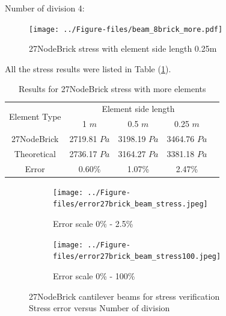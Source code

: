 \documentclass[fleqn,11pt]{article}
\begin{document}
Number of division 4:

\begin{figure}[H]
  \centering
  \texttt{[image: ../Figure-files/beam\_8brick\_more.pdf]}
  \caption{27NodeBrick stress with element side length 0.25m}
  \label{fig 27NodeBrick stress with element side length 0.25m}
\end{figure}


All the stress results were listed in Table (\ref{table Results for 27NodeBrick stress with more elements}). 


\begin{table}[H]
  \centering
  \caption{Results for 27NodeBrick stress with more elements}
  \label{table Results for 27NodeBrick stress with more elements}
  \begin{tabular}{|c|c|c|c|c|}
    \hline 
    \multirow{2}{*}{Element Type} 
       & \multicolumn{3}{|c|}{Element side length} \\ \cline{2-4}
       & 1 $m$ & 0.5 $m$ & 0.25 $m$ \\                              \hline
27NodeBrick & 2719.81 $Pa$ & 3198.19 $Pa$ & 3464.76 $Pa$ \\ \hline
Theoretical & 2736.17 $Pa$ & 3164.27 $Pa$ & 3381.18 $Pa$ \\ \hline
Error       & 0.60\%  & 1.07\%  & 2.47\%        \\ \hline
  \end{tabular}
\end{table}



\begin{figure}[H]
  \begin{subfigure}{0.5\textwidth}
    \centering
    \texttt{[image: ../Figure-files/error27brick\_beam\_stress.jpeg]}
    \caption{Error scale 0\% - 2.5\%}
  \end{subfigure}
  \begin{subfigure}{0.5\textwidth}
    \centering
    \texttt{[image: ../Figure-files/error27brick\_beam\_stress100.jpeg]}
    \caption{Error scale 0\% - 100\%}
  \end{subfigure}
  \captionsetup{justification=centering,margin=3cm}
  \caption{27NodeBrick cantilever beams for stress verification\\
      Stress error   versus   Number of division}
\end{figure}
\end{document}
